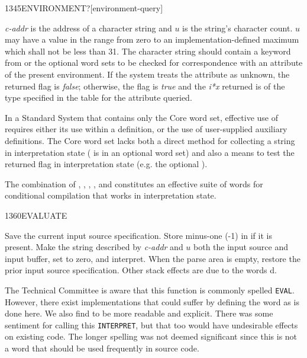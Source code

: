 \begin{newword}{1345}{ENVIRONMENT?}[environment-query]

	\emph{c-addr} is the address of a character string and $u$ is
	the string's character count. $u$ may have a value in the range
	from zero to an implementation-defined maximum which shall not
	be less than 31. The character string should contain a keyword
	from  or the
	optional word sets to be checked for correspondence with an
	attribute of the present environment. If the system treats the
	attribute as unknown, the returned flag is \emph{false};
	otherwise, the flag is \emph{true} and the \emph{i*x} returned
	is of the type specified in the table for the attribute queried.

	\begin{rationale} %
		In a Standard System that contains only the Core word set,
		effective use of  requires either its use
		within a definition, or the use of user-supplied auxiliary
		definitions. The Core word set lacks both a direct method for
		collecting a string in interpretation state (
		is in an optional word set) and also a means to test the
		returned flag in interpretation state (e.g. the optional
		).

		The combination of
		,
		,
		,
		, and
		constitutes an effective suite of words for conditional
		compilation that works in interpretation state.
	\end{rationale}
\end{newword}


\begin{newword}{1360}{EVALUATE}

	Save the current input source specification. Store minus-one
	(-1) in  if it is present. Make the string
	described by \emph{c-addr} and $u$ both the input source and
	input buffer, set  to zero, and interpret. When the
	parse area is empty, restore the prior input source
	specification. Other stack effects are due to the words
	d.

	\begin{rationale} %
		The Technical Committee is aware that this function is
		commonly spelled \texttt{EVAL}. However, there exist
		implementations that could suffer by defining the word as is
		done here. We also find  to be more readable
		and explicit. There was some sentiment for calling this
		\texttt{INTERPRET}, but that too would have undesirable
		effects on existing code. The longer spelling was not deemed
		significant since this is not a word that should be used
		frequently in source code.
	\end{rationale}
\end{newword}


